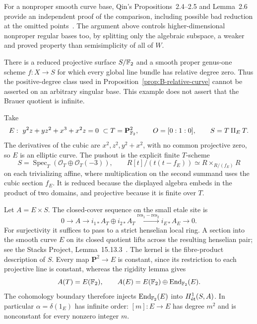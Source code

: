 For a nonproper smooth curve base, Qin's Propositions~2.4--2.5 and
Lemma~2.6 provide an independent proof of the comparison, including
possible bad reduction at the omitted points~\cite{BQin2024}.
The argument above controls higher-dimensional nonproper regular
bases too, by splitting only the algebraic subspace, a weaker and
proved property than semisimplicity of all of \(W\).


\begin{example}
\label{ex:B-singular-infinite-period}
There is a reduced projective surface \(S/\mathbb F_2\) and a smooth
proper genus-one scheme \(f:X\to S\) for which every global line
bundle has relative degree zero.  Thus the positive-degree class
used in Proposition~\ref{prop:B-relative-curve} cannot be asserted
on an arbitrary singular base.  This example does not assert that
the Brauer quotient is infinite.

Take
\[
 E:\ y^2z+yz^2+x^3+x^2z=0\ \subset T=\mathbf P^2_{\mathbb F_2},
 \qquad O=[0:1:0],
 \qquad S=T\amalg_E T.
\]
The derivatives of the cubic are \(x^2,z^2,y^2+x^2\), with no
common projective zero, so \(E\) is an elliptic curve.  The
pushout is the explicit finite \(T\)-scheme
\[
 S=\operatorname{Spec}_T(\mathcal O_T\oplus\mathcal O_T(-3)),
 \qquad
 R[t]/(t(t-f_E))\simeq R\times_{R/(f_E)}R
\]
on each trivializing affine, where multiplication on the second
summand uses the cubic section \(f_E\).  It is reduced because
the displayed algebra embeds in the product of two domains, and
projective because it is finite over \(T\).

Let \(A=E\times S\).  The closed-cover sequence on the small
etale site is
\[
 0\longrightarrow A\longrightarrow i_{1*}A_T\oplus i_{2*}A_T
 \xrightarrow{\mathrm{res}_1-\mathrm{res}_2}i_{E*}A_E
 \longrightarrow0.
\]
For surjectivity it suffices to pass to a strict henselian local
ring.  A section into the smooth curve \(E\) on its closed
quotient lifts across the resulting henselian pair; see the Stacks
Project, Lemma~15.13.3~\cite{BStacksSmoothLift}.  The kernel is
the fibre-product description of \(S\).  Every map
\(\mathbf P^2\to E\) is constant, since its restriction to
each projective line is constant, whereas the rigidity lemma gives
\[
 A(T)=E(\mathbb F_2),\qquad
 A(E)=E(\mathbb F_2)\oplus\operatorname{End}_{\mathbb F_2}(E).
\]
The cohomology boundary therefore injects
\(\operatorname{End}_{\mathbb F_2}(E)\) into \(H^1_{\mathrm{\acute et}}(S,A)\).
In particular \(\alpha=\delta(1_E)\) has infinite order:
\([m]:E\to E\) has degree \(m^2\) and is nonconstant for every
nonzero integer \(m\).


\end{example}
